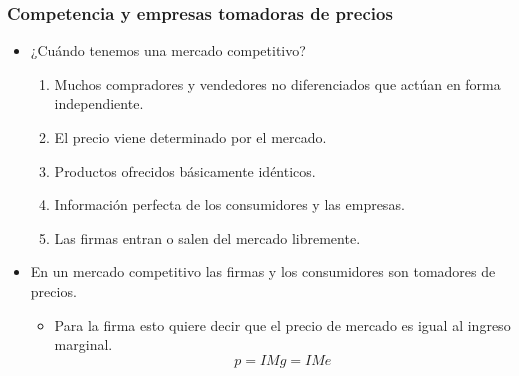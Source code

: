 \documentclass{beamer}
\begin{document}
\begin{frame}
\frametitle{Competencia y empresas tomadoras de precios}
\begin{itemize}
    \item ¿Cuándo tenemos una mercado competitivo?
    \begin{enumerate}
        \item Muchos compradores y vendedores no diferenciados que actúan en forma independiente.
        \item El precio viene determinado por el mercado.
        \item Productos ofrecidos básicamente idénticos.
        \item Información perfecta de los consumidores y las empresas.
        \item Las firmas entran o salen del mercado libremente.
    \end{enumerate}
    \item En un mercado competitivo las firmas y los consumidores son tomadores de precios.
    \begin{itemize}
        \item Para la firma esto quiere decir que el precio de mercado es igual al ingreso marginal.
        \[ p = IMg = IMe \]
    \end{itemize}
\end{itemize}
\end{frame}
\end{document}

